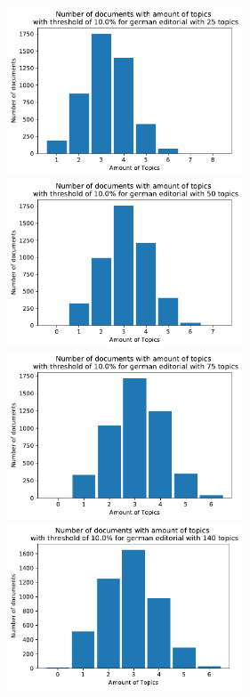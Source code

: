 \begin{figure}
	\begin{minipage}[t]{0.5\textwidth}
		\includegraphics[width=7cm]{gfx/GrafikenFinal/germaneditoriallda_topPerdoc25.pdf}
	\end{minipage}
	\begin{minipage}[t]{0.5\textwidth}
		\includegraphics[width=7cm]{gfx/GrafikenFinal/germaneditoriallda_topPerdoc50.pdf}
	\end{minipage}
	\begin{minipage}[t]{0.5\textwidth}
		\includegraphics[width=7cm]{gfx/GrafikenFinal/germaneditoriallda_topPerdoc75.pdf}
	\end{minipage}
	\begin{minipage}[t]{0.5\textwidth}
		\includegraphics[width=7cm]{gfx/GrafikenFinal/germaneditoriallda_topPerdoc140.pdf}

\end{minipage}
\end{figure}
